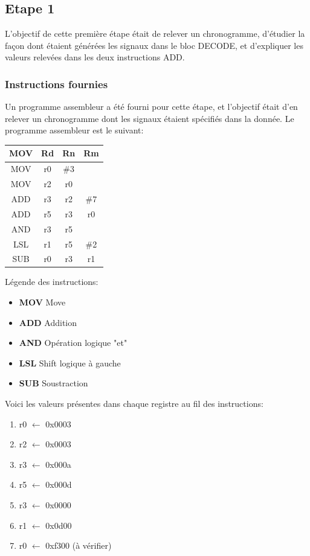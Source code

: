 \documentclass[a4paper]{article} %
\begin{document}
\subsection{Etape 1}
L'objectif de cette première étape était de relever un chronogramme, d'étudier la façon dont étaient générées les signaux dans le bloc DECODE, et d'expliquer les valeurs relevées dans les deux instructions ADD.
\subsubsection{Instructions fournies}
Un programme assembleur a été fourni pour cette étape, et l'objectif était d'en relever un chronogramme dont les signaux étaient spécifiés dans la donnée.
Le programme assembleur est le suivant:\medskip \\ 
\begin{center}
\begin{tabular}{|c|c|c|c|}
    \hline
    MOV  & Rd & Rn   & Rm  \\
    \hline
    MOV  & r0 & \#3  &     \\
    \hline
    MOV  & r2 & r0   &     \\
    \hline
    ADD  & r3 & r2   & \#7 \\
    \hline
    ADD  & r5 & r3   & r0  \\
    \hline
    AND  & r3 & r5   &     \\
    \hline
    LSL  & r1 & r5   & \#2 \\
    \hline
    SUB  & r0 & r3   & r1  \\
    \hline
\end{tabular}
\end{center}

Légende des instructions:
\begin{itemize}
    \item \textbf{MOV} Move
    \item \textbf{ADD} Addition
    \item \textbf{AND} Opération logique "et"
    \item \textbf{LSL} Shift logique à gauche
    \item \textbf{SUB} Soustraction    
\end{itemize}
\medskip
Voici les valeurs présentes dans chaque registre au fil des instructions:
\begin{enumerate}
    \item r0 $\leftarrow$ 0x0003
    \item r2 $\leftarrow$ 0x0003
    \item r3 $\leftarrow$ 0x000a
    \item r5 $\leftarrow$ 0x000d
    \item r3 $\leftarrow$ 0x0000
    \item r1 $\leftarrow$ 0x0d00
    \item r0 $\leftarrow$ 0xf300 (à vérifier)
\end{enumerate}
\end{document}
